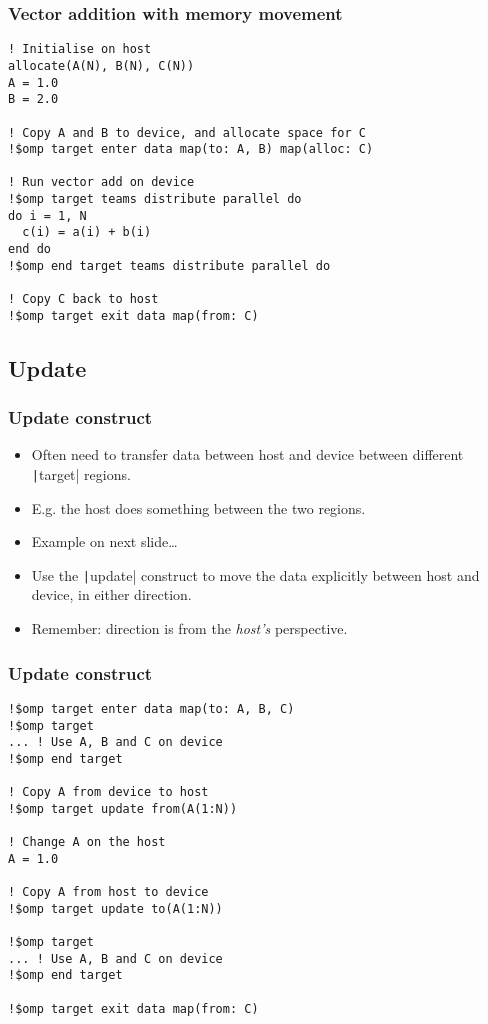 \documentclass{beamer}
\begin{document}
\begin{frame}[fragile]
\frametitle{Vector addition with memory movement}

\begin{verbatim}
! Initialise on host
allocate(A(N), B(N), C(N))
A = 1.0
B = 2.0

! Copy A and B to device, and allocate space for C
!$omp target enter data map(to: A, B) map(alloc: C)

! Run vector add on device
!$omp target teams distribute parallel do
do i = 1, N
  c(i) = a(i) + b(i)
end do
!$omp end target teams distribute parallel do

! Copy C back to host
!$omp target exit data map(from: C)

\end{verbatim}


\end{frame}

\subsection{Update}
\begin{frame}
\frametitle{Update construct}
\begin{itemize}
  \item Often need to transfer data between host and device between different \texttt|target| regions.
  \item E.g. the host does something between the two regions.
  \item Example on next slide\dots
  \item Use the \texttt|update| construct to move the data explicitly between host and device, in either direction.
  \item Remember: direction is from the \emph{host's} perspective.
\end{itemize}
\end{frame}

\begin{frame}[fragile]
\frametitle{Update construct}
\begin{verbatim}
!$omp target enter data map(to: A, B, C)
!$omp target
... ! Use A, B and C on device
!$omp end target

! Copy A from device to host
!$omp target update from(A(1:N))

! Change A on the host
A = 1.0

! Copy A from host to device
!$omp target update to(A(1:N))

!$omp target
... ! Use A, B and C on device
!$omp end target

!$omp target exit data map(from: C)
\end{verbatim}

\end{frame}
\end{document}
